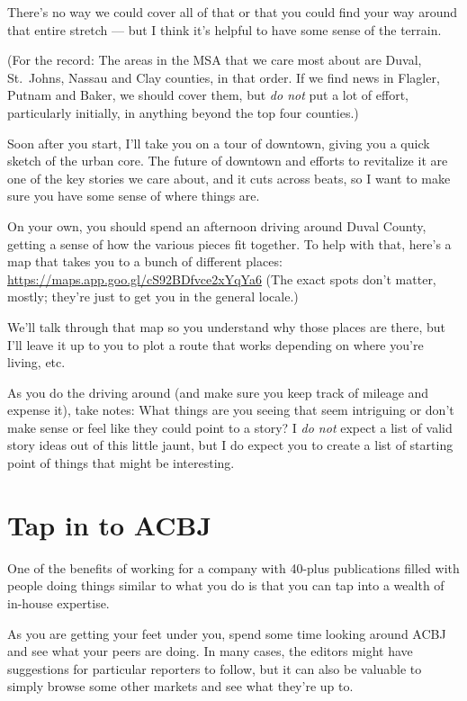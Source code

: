 \documentclass[
  11pt,
  american,
  letterpaperpaper,
  extrafontsizes,onecolumn,openright
  ]{memoir}
\begin{document}
There's no way we could cover all of that or that you could find your way around that entire stretch --- but I think it's helpful to have some sense of the terrain.

(For the record: The areas in the MSA that we care most about are Duval, St.~Johns, Nassau and Clay counties, in that order. If we find news in Flagler, Putnam and Baker, we should cover them, but \emph{do not} put a lot of effort, particularly initially, in anything beyond the top four counties.)

Soon after you start, I'll take you on a tour of downtown, giving you a quick sketch of the urban core. The future of downtown and efforts to revitalize it are one of the key stories we care about, and it cuts across beats, so I want to make sure you have some sense of where things are.

On your own, you should spend an afternoon driving around Duval County, getting a sense of how the various pieces fit together. To help with that, here's a map that takes you to a bunch of different places: \url{https://maps.app.goo.gl/cS92BDfvce2xYqYa6} (The exact spots don't matter, mostly; they're just to get you in the general locale.)

We'll talk through that map so you understand why those places are there, but I'll leave it up to you to plot a route that works depending on where you're living, etc.

As you do the driving around (and make sure you keep track of mileage and expense it), take notes: What things are you seeing that seem intriguing or don't make sense or feel like they could point to a story? I \emph{do not} expect a list of valid story ideas out of this little jaunt, but I do expect you to create a list of starting point of things that might be interesting.

\hypertarget{tap-in-to-acbj}{%
\section*{Tap in to ACBJ}\label{tap-in-to-acbj}}

One of the benefits of working for a company with 40-plus publications filled with people doing things similar to what you do is that you can tap into a wealth of in-house expertise.

As you are getting your feet under you, spend some time looking around ACBJ and see what your peers are doing. In many cases, the editors might have suggestions for particular reporters to follow, but it can also be valuable to simply browse some other markets and see what they're up to.
\end{document}

